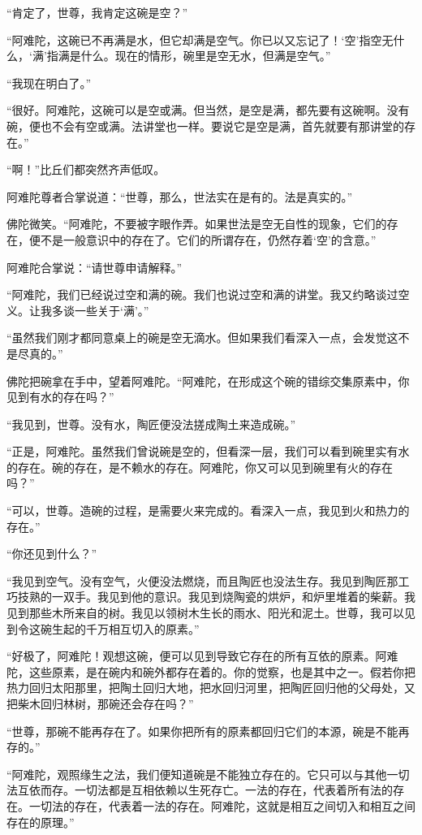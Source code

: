 \documentclass[12pt,twoside,openany]{book}
\begin{document}
“肯定了，世尊，我肯定这碗是空？”

“阿难陀，这碗已不再满是水，但它却满是空气。你已以又忘记了！‘空’指空无什么，‘满’指满是什么。现在的情形，碗里是空无水，但满是空气。”

“我现在明白了。”

“很好。阿难陀，这碗可以是空或满。但当然，是空是满，都先要有这碗啊。没有碗，便也不会有空或满。法讲堂也一样。要说它是空是满，首先就要有那讲堂的存在。”

“啊！”比丘们都突然齐声低叹。

阿难陀尊者合掌说道：“世尊，那么，世法实在是有的。法是真实的。”

佛陀微笑。“阿难陀，不要被字眼作弄。如果世法是空无自性的现象，它们的存在，便不是一般意识中的存在了。它们的所谓存在，仍然存着‘空’的含意。”

阿难陀合掌说：“请世尊申请解释。”

“阿难陀，我们已经说过空和满的碗。我们也说过空和满的讲堂。我又约略谈过空义。让我多谈一些关于‘满’。”

“虽然我们刚才都同意桌上的碗是空无滴水。但如果我们看深入一点，会发觉这不是尽真的。”

佛陀把碗拿在手中，望着阿难陀。“阿难陀，在形成这个碗的错综交集原素中，你见到有水的存在吗？”

“我见到，世尊。没有水，陶匠便没法搓成陶土来造成碗。”

“正是，阿难陀。虽然我们曾说碗是空的，但看深一层，我们可以看到碗里实有水的存在。碗的存在，是不赖水的存在。阿难陀，你又可以见到碗里有火的存在吗？”

“可以，世尊。造碗的过程，是需要火来完成的。看深入一点，我见到火和热力的存在。”

“你还见到什么？”

“我见到空气。没有空气，火便没法燃烧，而且陶匠也没法生存。我见到陶匠那工巧技熟的一双手。我见到他的意识。我见到烧陶瓷的烘炉，和炉里堆着的柴薪。我见到那些木所来自的树。我见以领树木生长的雨水、阳光和泥土。世尊，我可以见到令这碗生起的千万相互切入的原素。”

“好极了，阿难陀！观想这碗，便可以见到导致它存在的所有互依的原素。阿难陀，这些原素，是在碗内和碗外都存在着的。你的觉察，也是其中之一。假若你把热力回归太阳那里，把陶土回归大地，把水回归河里，把陶匠回归他的父母处，又把柴木回归林树，那碗还会存在吗？”

“世尊，那碗不能再存在了。如果你把所有的原素都回归它们的本源，碗是不能再存的。”

“阿难陀，观照缘生之法，我们便知道碗是不能独立存在的。它只可以与其他一切法互依而存。一切法都是互相依赖以生死存亡。一法的存在，代表着所有法的存在。一切法的存在，代表着一法的存在。阿难陀，这就是相互之间切入和相互之间存在的原理。”
\end{document}
